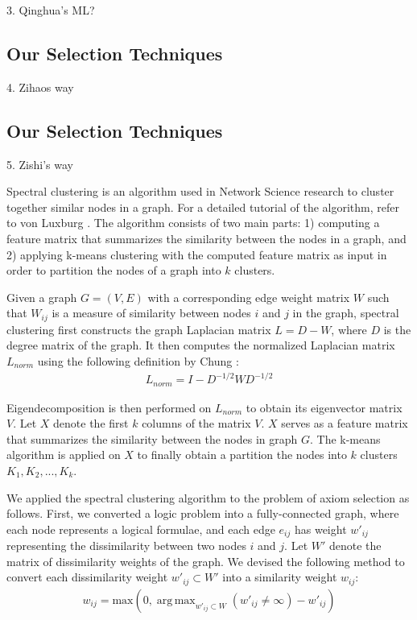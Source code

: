 \documentclass[EPiC]{easychair}
\DeclareMathOperator*{\argmaxA}{arg\,max} %
\begin{document}
3. Qinghua's ML?
\subsection{Our Selection Techniques}
\label{Zihao}

4. Zihaos way
\subsection{Our Selection Techniques}
\label{Zishi}

5. Zishi's way

Spectral clustering is an algorithm used in Network Science research to
cluster together similar nodes in a graph. For a detailed tutorial of the 
algorithm, refer to von Luxburg \cite{vonLuxburg2007}. The algorithm consists 
of two main parts: 1) computing a feature matrix that summarizes the 
similarity between the nodes in a graph, and 2) applying k-means clustering
with the computed feature matrix as input in order to partition the nodes of 
a graph into $k$ clusters.

Given a graph $G = (V, E)$ with a corresponding edge weight matrix $W$ such 
that $W_{ij}$ is a measure of similarity between nodes $i$ and $j$ 
in the graph, spectral clustering first constructs the graph Laplacian matrix 
$L = D - W$, where $D$ is the degree matrix of the graph. It then computes 
the normalized Laplacian matrix $L_{norm}$ using the following definition by 
Chung \cite{Chung1997}:
\begin{align}
L_{norm} = I - D^{-1/2} W D^{-1/2}
\end{align}

Eigendecomposition is then performed on $L_{norm}$ to obtain its eigenvector
matrix $V$. Let $X$ denote the first $k$ columns of the matrix $V$. 
$X$ serves as a feature matrix that summarizes the similarity between the 
nodes in graph $G$. The k-means algorithm is applied on $X$ to finally obtain 
a partition the nodes into $k$ clusters $K_{1}, K_{2}, ..., K_{k}$.

We applied the spectral clustering algorithm to the problem of axiom 
selection as follows. First, we converted a logic problem into a 
fully-connected graph, where each node represents a logical formulae, and
each edge $e_{ij}$ has weight $w'_{ij}$ representing the dissimilarity 
between two nodes $i$ and $j$. Let $W'$ denote the matrix of dissimilarity 
weights of the graph. We devised the following method to convert each 
dissimilarity weight $w'_{ij} \subset W'$ into a similarity weight $w_{ij}$:
\begin{align}
w_{ij} = \textrm{max}(0, 
	\argmaxA_{w'_{ij} \subset W} (w'_{ij} \neq \infty) - w'_{ij})
\end{align}
\end{document}

